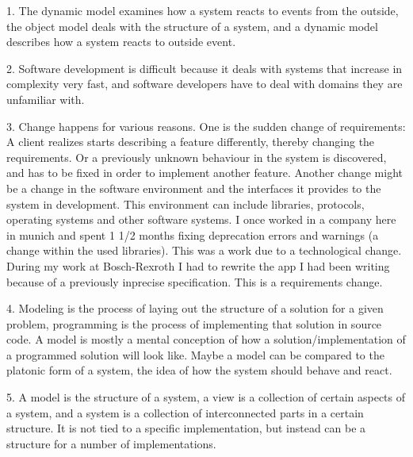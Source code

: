 \documentclass[11pt,a4paper]{article}
\begin{document}
\thispagestyle{empty}
\pagestyle{empty}

1. The dynamic model examines how a system reacts to events from the
outside, the object model deals with the structure of a system, and a
dynamic model describes how a system reacts to outside event.

2. Software development is difficult because it deals with systems that
increase in complexity very fast, and software developers have to deal
with domains they are unfamiliar with.

3. Change happens for various reasons. One is the sudden change of
requirements: A client realizes starts describing a feature differently,
thereby changing the requirements. Or a previously unknown behaviour
in the system is discovered, and has to be fixed in order to implement
another feature. Another change might be a change in the software
environment and the interfaces it provides to the system in development.
This environment can include libraries, protocols, operating systems
and other software systems. I once worked in a company here in munich
and spent 1 1/2 months fixing deprecation errors and warnings (a change
within the used libraries). This was a work due to a technological change.
During my work at Bosch-Rexroth I had to rewrite the app I had been
writing because of a previously inprecise specification. This is a
requirements change.

4. Modeling is the process of laying out the structure of a solution
for a given problem, programming is the process of implementing that
solution in source code. A model is mostly a mental conception of how
a solution/implementation of a programmed solution will look like.
Maybe a model can be compared to the platonic form of a system,
the idea of how the system should behave and react.

5. A model is the structure of a system, a view is a collection of certain
aspects of a system, and a system is a collection of interconnected
parts in a certain structure. It is not tied to a specific implementation,
but instead can be a structure for a number of implementations.
\end{document}
